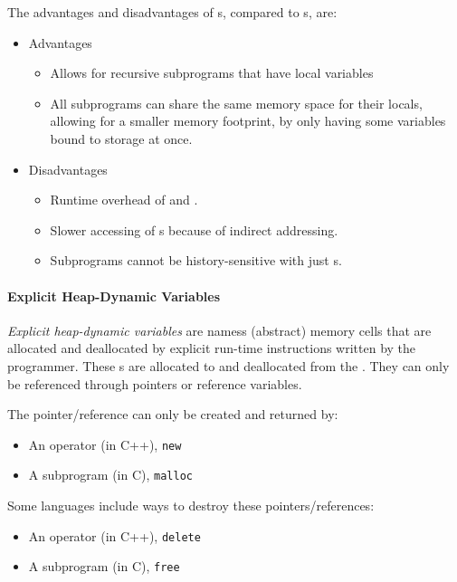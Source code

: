 The advantages and disadvantages of s, compared to s, are:
\begin{itemize}[noitemsep]
\item Advantages
  \begin{itemize}[noitemsep]
  \item Allows for recursive subprograms that have local variables
  \item All subprograms can share the same memory space for their locals, allowing for a smaller memory footprint, by only having some variables bound to storage at once.
  \end{itemize}
\item Disadvantages
  \begin{itemize}[noitemsep]
  \item Runtime overhead of  and .
  \item Slower accessing of s because of indirect addressing.
  \item Subprograms cannot be history-sensitive with just s.
  \end{itemize}
\end{itemize}

\paragraph{Explicit Heap-Dynamic Variables}\label{par:Explicit_Heap-Dynamic_Variable_Binding_Lifetime}
\begin{definition}\label{def:Explicit_Heap-Dynamic_Variable_Binding_Lifetime}
  \emph{Explicit heap-dynamic variables} are namess (abstract) memory cells that are allocated and deallocated by explicit run-time instructions written by the programmer.
  These s are allocated to and deallocated from the .
  They can only be referenced through pointers or reference variables.

  The pointer/reference can only be created and returned by:
  \begin{itemize}[noitemsep]
  \item An operator (in C++), \texttt{new}
  \item A subprogram (in C), \texttt{malloc}
  \end{itemize}

  Some languages include ways to destroy these pointers/references:
  \begin{itemize}[noitemsep]
  \item An operator (in C++), \texttt{delete}
  \item A subprogram (in C), \texttt{free}
  \end{itemize}
\end{definition}

